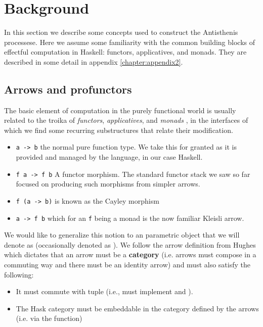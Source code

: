 \section{Background}

In this section we describe some concepts used to construct the
Antisthenis processese. Here we assume some familiarity with the
common building blocks of effectful computation in Haskell: functors,
applicatives, and monads. They are described in some detail in
appendix \ref{chapter:appendix2}.

\subsection{Arrows and profunctors}

The basic element of computation in the purely functional world is
usually related to the troika of \emph{functors}, \emph{applicatives},
and \emph{monads} \cite{yorgeyTypeclassopedia2009}, in the interfaces
of which we find some recurring substructures that relate their
modification.

\begin{itemize}
\item \texttt{a -> b} the normal pure function type. We take this for granted as
it is provided and managed by the language, in our case Haskell.
\item \texttt{f a -> f b} A functor morphism. The standard functor stack we saw
so far focused on producing such morphisms from simpler arrows.
\item \texttt{f (a -> b)} is known as the Cayley morphism
\item \texttt{a -> f b} which for an \texttt{f} being a monad is the now familiar
Kleisli arrow.
\end{itemize}

We would like to generalize this notion to an parametric object that
we will denote as \hask{~>} (occasionally denoted as  ). We
follow the arrow definition from Hughes
\cite{hughesProgrammingArrows2005} which dictates that an arrow must
be a \textbf{category} (i.e. arrows must compose in a commuting way
and there must be an identity arrow) and must also satisfy the
following:

\begin{itemize}
\item It must commute with tuple (i.e., must implement  and
  ).
\item The Hask category must be embeddable in the category defined by the
arrows (i.e. via the  function)
\end{itemize}

